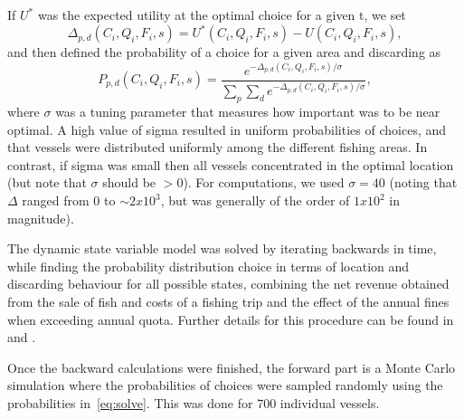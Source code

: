 \documentclass[12pt,oneline,a4paper,numbib]{ouparticle}
\numberwithin{equation}{subsection} %
\begin{document}
If $U^*$ was the expected utility at the optimal choice for a given t, we set
\begin{equation}
\Delta_{p, d}(C_i, Q_i, F_i, s) =  U^* (C_i, Q_i, F_i, s) - U (C_i, Q_i, F_i, s),
\end{equation}
and then defined the probability of a choice for a given area and discarding as	
\begin{equation} \label{eq:solve}
P_{p, d}(C_i, Q_i, F_i, s) = \frac
                {e^{ -\Delta_{p, d}(C_i, Q_i, F_i, s)/\sigma}}
                {\sum_p \sum_d e^{ -\Delta_{p, d}(C_i, Q_i, F_i, s)/\sigma}},
\end{equation}
where $\sigma$ was a tuning parameter that measures how important was to be near optimal. A high value of sigma resulted in uniform probabilities of choices, and that vessels were distributed uniformly among the different fishing areas. In contrast, if sigma was small then all vessels concentrated in the optimal location (but note that $\sigma$ should be $> 0$). For computations, we used $\sigma = 40$ (noting that $\Delta$ ranged from 0 to $\sim 2 x 10^{3}$, but was generally of the order of $1 x 10^2$ in magnitude).

The dynamic state variable model was solved by iterating backwards in time, while finding the probability distribution choice in terms of location and discarding behaviour for all possible states, combining the net revenue obtained from the sale of fish and costs of a fishing trip and the effect of the annual fines when exceeding annual quota. Further details for this procedure can be found in \cite{Alzorriz2018, Batsleer2016} and \cite{Dowling2011}.

Once the backward calculations were finished, the forward part is a Monte Carlo simulation where the probabilities of choices were sampled randomly using the probabilities in~\ref{eq:solve}. This was done for 700 individual vessels. 
\end{document}
